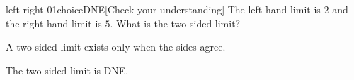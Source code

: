 \begin{bgcheck}{left-right-01}{choice}{DNE}[Check your understanding]
The left-hand limit is \(2\) and the right-hand limit is \(5\). What is the two-sided limit?
\begin{bghint}
A two-sided limit exists only when the sides agree.
\end{bghint}
\begin{bgreveal}
The two-sided limit is DNE.
\end{bgreveal}
\end{bgcheck}
